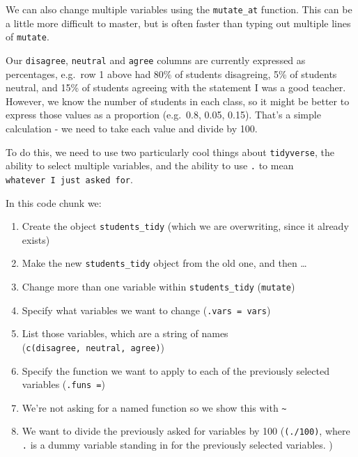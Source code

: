 \documentclass[
]{book}
\newenvironment{Shaded}{\begin{snugshade}}{\end{snugshade}}
\newcommand{\DataTypeTok}[1]{\textcolor[rgb]{0.13,0.29,0.53}{#1}}
\newcommand{\DecValTok}[1]{\textcolor[rgb]{0.00,0.00,0.81}{#1}}
\newcommand{\KeywordTok}[1]{\textcolor[rgb]{0.13,0.29,0.53}{\textbf{#1}}}
\newcommand{\NormalTok}[1]{#1}
\newcommand{\OperatorTok}[1]{\textcolor[rgb]{0.81,0.36,0.00}{\textbf{#1}}}
\newcommand{\StringTok}[1]{\textcolor[rgb]{0.31,0.60,0.02}{#1}}
\providecommand{\tightlist}{%
  \setlength{\itemsep}{0pt}\setlength{\parskip}{0pt}}
\begin{document}
We can also change multiple variables using the \texttt{mutate\_at} function. This can be a little more difficult to master, but is often faster than typing out multiple lines of \texttt{mutate}.

Our \texttt{disagree}, \texttt{neutral} and \texttt{agree} columns are currently expressed as percentages, e.g.~row 1 above had 80\% of students disagreing, 5\% of students neutral, and 15\% of students agreeing with the statement I was a good teacher. However, we know the number of students in each class, so it might be better to express those values as a proportion (e.g.~0.8, 0.05, 0.15). That's a simple calculation - we need to take each value and divide by 100.

To do this, we need to use two particularly cool things about \texttt{tidyverse}, the ability to select multiple variables, and the ability to use \texttt{.} to mean \texttt{whatever\ I\ just\ asked\ for}.

\begin{Shaded}
\end{Shaded}

\begin{translate}
In this code chunk we:

\begin{enumerate}
\def\arabic{enumi}.{\arabic{enumi}.}
\tightlist
\item
  Create the object \texttt{students\_tidy} (which we are overwriting,
  since it already exists)
\item
  Make the new \texttt{students\_tidy} object from the old one, and then
  \ldots{}
\item
  Change more than one variable within \texttt{students\_tidy}
  (\texttt{mutate})
\item
  Specify what variables we want to change (\texttt{.vars\ =\ vars})
\item
  List those variables, which are a string of names
  (\texttt{c(disagree,\ neutral,\ agree)})
\item
  Specify the function we want to apply to each of the previously
  selected variables (\texttt{.funs\ =})
\item
  We're not asking for a named function so we show this with
  \texttt{\textasciitilde{}}
\item
  We want to divide the previously asked for variables by 100
  (\texttt{(./100)}, where \texttt{.} is a dummy variable standing in
  for the previously selected variables. )
\end{enumerate}
\end{translate}
\end{document}
